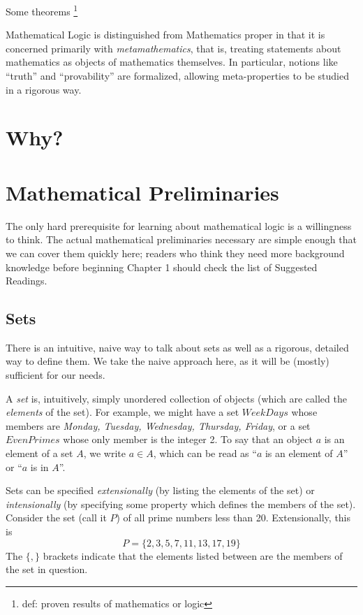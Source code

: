 Some theorems \footnote{def: proven results of mathematics or logic} 

Mathematical Logic is distinguished from Mathematics proper in that it is concerned primarily with \emph{metamathematics}, that is, treating statements about mathematics as objects of mathematics themselves. In particular, notions like ``truth'' and ``provability'' are formalized, allowing meta-properties to be studied in a rigorous way. 


\section{Why?}

\section{Mathematical Preliminaries}
The only hard prerequisite for learning about mathematical logic is a willingness to think. The actual mathematical preliminaries necessary are simple enough that we can cover them quickly here; readers who think they need more background knowledge before beginning Chapter 1 should check the list of Suggested Readings. 

\subsection{Sets}
There is an intuitive, naive way to talk about sets as well as a rigorous, detailed way to define them. We take the naive approach here, as it will be (mostly) sufficient for our needs. 

A \emph{set} is, intuitively, simply unordered collection of objects (which are called the \emph{elements} of the set). For example, we might have a set $WeekDays$ whose members are \emph{Monday, Tuesday, Wednesday, Thursday, Friday}, or a set $EvenPrimes$ whose only member is the integer 2. To say that an object $a$ is an element of a set $A$, we write $a \in A$, which can be read as ``$a$ is an element of $A$'' or ``$a$ is in $A$''. 

Sets can be specified \emph{extensionally} (by listing the elements of the set) or \emph{intensionally} (by specifying some property which defines the members of the set). Consider the set (call it $P$) of all prime numbers less than 20. Extensionally, this is
\[
  P = \{2, 3, 5, 7, 11, 13, 17, 19\}
\]
The $\{,\}$ brackets indicate that the elements listed between are the members of the set in question. 

